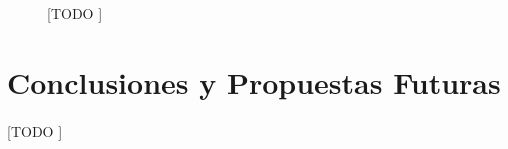 \documentclass[10pt, a4paper,spanish]{article}
\begin{document}
		\begin{figure}[h]
			\centering
			\inputminted{cuda}{./code/error.cu}
			\caption{[TODO ]}
			\label{code:error}
		\end{figure}

	\section{Conclusiones y Propuestas Futuras}

		\paragraph{}
		[TODO ]

	\nocite{subject:cp}
  
  
\end{document}
